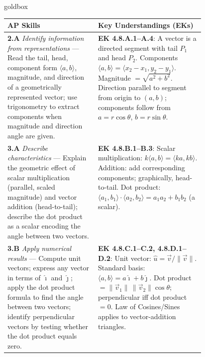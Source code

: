 \documentclass[10pt]{article}
\begin{document}
\begin{skillbox}{goldbox}
\begin{tabularx}{\linewidth}{@{} p{0.46\linewidth} X @{}}
\textbf{AP Skills} & \textbf{Key Understandings (EKs)} \\
\midrule
\textbf{2.A} \textit{Identify information from representations} ---
  Read the tail, head, component form $\langle a,b\rangle$, magnitude, and
  direction of a geometrically represented vector; use trigonometry to
  extract components when magnitude and direction angle are given.
&
\textbf{EK 4.8.A.1--A.4}: A vector is a directed segment with tail $P_1$
and head $P_2$. Components $\langle a,b\rangle = \langle x_2-x_1,y_2-y_1\rangle$.
Magnitude $= \sqrt{a^2+b^2}$. Direction parallel to segment from origin to
$(a,b)$; components follow from $a = r\cos\theta$, $b = r\sin\theta$. \\[4pt]

\textbf{3.A} \textit{Describe characteristics} ---
  Explain the geometric effect of scalar multiplication (parallel, scaled
  magnitude) and vector addition (head-to-tail); describe the dot product as
  a scalar encoding the angle between two vectors.
&
\textbf{EK 4.8.B.1--B.3}: Scalar multiplication: $k\langle a,b\rangle
= \langle ka,kb\rangle$. Addition: add corresponding components; graphically,
head-to-tail. Dot product: $\langle a_1,b_1\rangle\cdot\langle a_2,b_2\rangle
= a_1 a_2+b_1 b_2$ (a scalar). \\[4pt]

\textbf{3.B} \textit{Apply numerical results} ---
  Compute unit vectors; express any vector in terms of $\hat{\imath}$ and
  $\hat{\jmath}$; apply the dot product formula to find the angle between two
  vectors; identify perpendicular vectors by testing whether the dot product
  equals zero.
&
\textbf{EK 4.8.C.1--C.2, 4.8.D.1--D.2}: Unit vector:
$\hat{u} = \vec{v}/\|\vec{v}\|$. Standard basis:
$\langle a,b\rangle = a\hat{\imath}+b\hat{\jmath}$.
Dot product $= \|\vec{v}_1\|\,\|\vec{v}_2\|\cos\theta$; perpendicular iff
dot product $= 0$. Law of Cosines/Sines applies to vector-addition triangles. \\
\end{tabularx}
\end{skillbox}

\vspace{0.08in}
\end{document}
